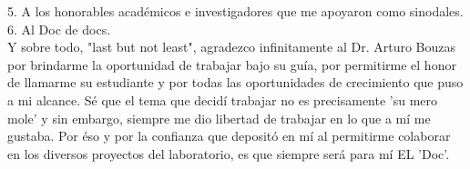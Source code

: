 \documentclass[
12pt, %
spanish, %
singlespacing, %
headsepline, %
]{MastersDoctoralThesis} %
\begin{document}
\begin{acknowledgements}

5. A los honorables académicos e investigadores que me apoyaron como sinodales.\\




6. Al Doc de docs.\\

Y sobre todo, "last but not least", agradezco infinitamente al Dr. Arturo Bouzas por brindarme la oportunidad de trabajar bajo su guía, por permitirme el honor de llamarme su estudiante y por todas las oportunidades de crecimiento que puso a mi alcance. Sé que el tema que decidí trabajar no es precisamente 'su mero mole' y sin embargo, siempre me dio libertad de trabajar en lo que a mí me gustaba. Por éso y por la confianza que depositó en mí al permitirme colaborar en los diversos proyectos del laboratorio, es que siempre será para mí EL 'Doc'.\\

\end{acknowledgements}


\tableofcontents %
\end{document}

